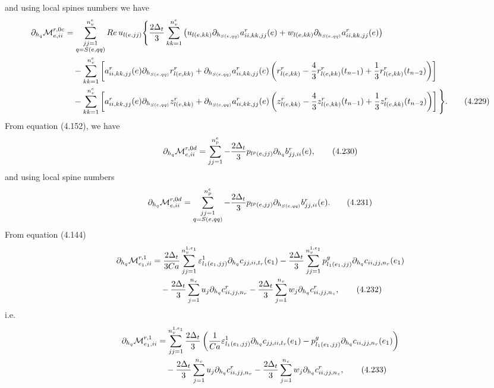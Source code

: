\documentclass{article}
\begin{document}
and using local spines numbers we have
\begin{align}
\partial_{h_q}\mathcal{M}_{e,ii}^{r,0c} &= \sum_{\substack{jj=1\\ q=S(e,qq)}}^{n_v^e} Re\, u_{l(e,jj)} \Bigg\{ \frac{2\Delta_t}{3} \sum_{kk=1}^{n_v^e} \left( u_{l(e,kk)} \partial_{h_{S(e,qq)}} a_{ii,kk,jj}^r(e) + w_{l(e,kk)} \partial_{h_{S(e,qq)}} a_{ii,kk,jj}^r(e) \right) \nonumber\\
&\quad - \sum_{kk=1}^{n_v^e} \left[ a_{ii,kk,jj}^r(e) \partial_{h_{S(e,qq)}} r_{l(e,kk)}^r + \partial_{h_{S(e,qq)}} a_{ii,kk,jj}^r(e) \left( r_{l(e,kk)}^r - \frac{4}{3} r_{l(e,kk)}^r(t_{n-1}) + \frac{1}{3} r_{l(e,kk)}^r(t_{n-2}) \right) \right] \nonumber\\
&\quad - \sum_{kk=1}^{n_v^e} \left[ a_{ii,kk,jj}^r(e) \partial_{h_{S(e,qq)}} z_{l(e,kk)}^r + \partial_{h_{S(e,qq)}} a_{ii,kk,jj}^r(e) \left( z_{l(e,kk)}^r - \frac{4}{3} z_{l(e,kk)}^r(t_{n-1}) + \frac{1}{3} z_{l(e,kk)}^r(t_{n-2}) \right) \right] \Bigg\}. \tag{4.229}
\end{align}
From equation (4.152), we have
\begin{equation}
\partial_{h_q}\mathcal{M}_{e,ii}^{r,0d} = \sum_{jj=1}^{n_p^e} -\frac{2\Delta_t}{3} p_{l^p(e,jj)} \partial_{h_q} b_{jj,ii}^r(e), \tag{4.230}
\end{equation}
and using local spine numbers
\begin{equation}
\partial_{h_q}\mathcal{M}_{e,ii}^{r,0d} = \sum_{\substack{jj=1\\ q=S(e,qq)}}^{n_p^e} -\frac{2\Delta_t}{3} p_{l^p(e,jj)} \partial_{h_{S(e,qq)}} b_{jj,ii}^r(e). \tag{4.231}
\end{equation}
From equation (4.144)
\begin{align}
\partial_{h_q}\mathcal{M}_{e_1,ii}^{r,1} &= \frac{2\Delta_t}{3Ca} \sum_{jj=1}^{n_v^{1,e_1}} \varepsilon_{l_1(e_1,jj)}^1 \partial_{h_q} c_{jj,ii,t_r}(e_1) 
- \frac{2\Delta_t}{3} \sum_{jj=1}^{n_v^{1,e_1}} p_{l_1(e_1,jj)}^g \partial_{h_q} c_{ii,jj,n_r}(e_1) \nonumber\\
&\quad - \frac{2\Delta_t}{3} \sum_{j=1}^{n_v} u_j \partial_{h_q} c_{ii,jj,n_r}^r 
- \frac{2\Delta_t}{3} \sum_{j=1}^{n_v} w_j \partial_{h_q} c_{ii,jj,n_z}^r, \tag{4.232}
\end{align}
i.e.
\begin{align}
\partial_{h_q}\mathcal{M}_{e_1,ii}^{r,1} &= \sum_{jj=1}^{n_v^{1,e_1}} \frac{2\Delta_t}{3} \left( \frac{1}{Ca} \varepsilon_{l_1(e_1,jj)}^1 \partial_{h_q} c_{jj,ii,t_r}(e_1) - p_{l_1(e_1,jj)}^g \partial_{h_q} c_{ii,jj,n_r}(e_1) \right) \nonumber\\
&\quad - \frac{2\Delta_t}{3} \sum_{j=1}^{n_v} u_j \partial_{h_q} c_{ii,jj,n_r}^r 
- \frac{2\Delta_t}{3} \sum_{j=1}^{n_v} w_j \partial_{h_q} c_{ii,jj,n_z}^r, \tag{4.233}
\end{align}
\end{document}
